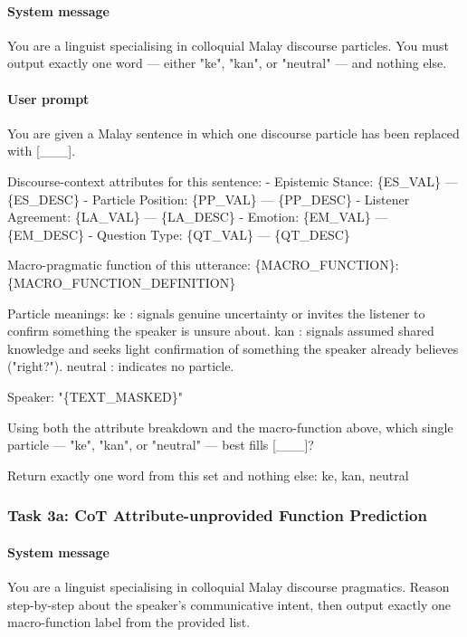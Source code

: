 \documentclass[11pt]{article}
\begin{document}
\paragraph{System message}
\begin{PromptBlock}
You are a linguist specialising in colloquial Malay discourse particles. You must output exactly one word --- either "ke", "kan", or "neutral" --- and nothing else.
\end{PromptBlock}

\paragraph{User prompt}
\begin{PromptBlock}
You are given a Malay sentence in which one discourse particle has been replaced with [\_\_\_].

Discourse-context attributes for this sentence:
- Epistemic Stance: \{ES\_VAL\} --- \{ES\_DESC\}
- Particle Position: \{PP\_VAL\} --- \{PP\_DESC\}
- Listener Agreement: \{LA\_VAL\} --- \{LA\_DESC\}
- Emotion: \{EM\_VAL\} --- \{EM\_DESC\}
- Question Type: \{QT\_VAL\} --- \{QT\_DESC\}

Macro-pragmatic function of this utterance:
\{MACRO\_FUNCTION\}: \{MACRO\_FUNCTION\_DEFINITION\}

Particle meanings:
  ke      : signals genuine uncertainty or invites the listener to confirm something the speaker is unsure about.
  kan     : signals assumed shared knowledge and seeks light confirmation of something the speaker already believes ("right?").
  neutral : indicates no particle.

Speaker:
  "\{TEXT\_MASKED\}"

Using both the attribute breakdown and the macro-function above, which single particle --- "ke", "kan", or "neutral" --- best fills [\_\_\_]?

Return exactly one word from this set and nothing else: ke, kan, neutral
\end{PromptBlock}


\subsubsection{Task 3a: CoT Attribute-unprovided Function Prediction}

\paragraph{System message}
\begin{PromptBlock}
You are a linguist specialising in colloquial Malay discourse pragmatics. Reason step-by-step about the speaker's communicative intent, then output exactly one macro-function label from the provided list.
\end{PromptBlock}
\end{document}

